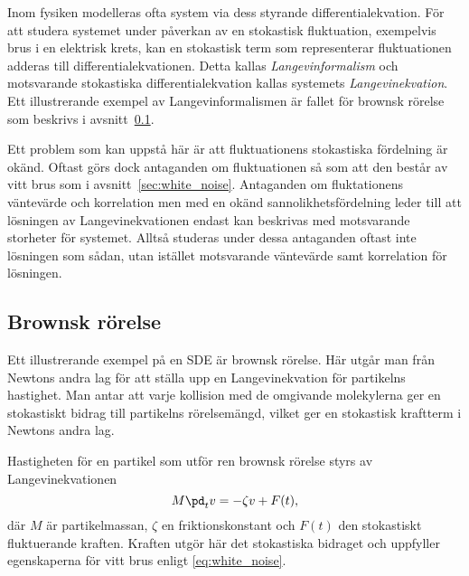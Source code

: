 Inom fysiken modelleras ofta system via dess styrande differentialekvation. För att studera systemet under påverkan av en stokastisk fluktuation, exempelvis brus i en elektrisk krets, kan en stokastisk term som representerar fluktuationen adderas till differentialekvationen. Detta kallas \emph{Langevinformalism} och motsvarande stokastiska differentialekvation kallas systemets \emph{Langevinekvation}. Ett illustrerande exempel av Langevinformalismen är fallet för brownsk rörelse som beskrivs i avsnitt~\ref{sec:brown}.

Ett problem som kan uppstå här är att fluktuationens stokastiska fördelning är okänd. Oftast görs dock antaganden om fluktuationen så som att den består av vitt brus som i avsnitt~\ref{sec:white_noise}. 
Antaganden om fluktationens väntevärde och korrelation men med en okänd sannolikhetsfördelning leder till att lösningen av Langevinekvationen endast kan beskrivas med motsvarande storheter för systemet. Alltså studeras under dessa antaganden oftast inte lösningen som sådan, utan istället motsvarande väntevärde samt korrelation för lösningen.  






\subsection{Brownsk rörelse}\label{sec:brown}
Ett illustrerande exempel på en SDE är brownsk rörelse. Här utgår man från Newtons andra lag för att ställa upp en Langevinekvation för partikelns hastighet. Man antar att varje kollision med de omgivande molekylerna ger en stokastiskt bidrag till partikelns rörelsemängd, vilket ger en stokastisk kraftterm i Newtons andra lag.

Hastigheten för en partikel som utför ren brownsk rörelse styrs av
Langevinekvationen~\cite{Mazo_Brownian2002} 
\begin{equation} \label{eq:Brownian_SDE}
    M\pd_tv=-\zeta v + F(t),
\end{equation}
där $M$ är partikelmassan, $\zeta$ en friktionskonstant och $F(t)$ den stokastiskt fluktuerande kraften. Kraften utgör här det stokastiska bidraget och uppfyller egenskaperna för vitt brus enligt \eqref{eq:white_noise}.


